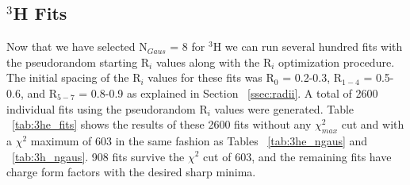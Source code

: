 \subsection{$^3$H Fits}
\label{ssec:3h_fits}

Now that we have selected N$_{Gaus}$ = 8 for $^3$H we can run several hundred fits with the pseudorandom starting R$_i$ values along with the R$_i$ optimization procedure. The initial spacing of the R$_i$ values for these fits was R$_0$ = 0.2-0.3, R$_{1-4}$ = 0.5-0.6, and R$_{5-7}$ = 0.8-0.9 as explained in Section ~\ref{ssec:radii}. A total of 2600 individual fits using the pseudorandom R$_i$ values were generated. Table ~\ref{tab:3he_fits} shows the results of these 2600 fits without any $\chi^2_{max}$ cut and with a $\chi^2$ maximum of 603 in the same fashion as Tables ~\ref{tab:3he_ngaus} and ~\ref{tab:3h_ngaus}. 908 fits survive the $\chi^2$ cut of 603, and the remaining fits have charge form factors with the desired sharp minima.


